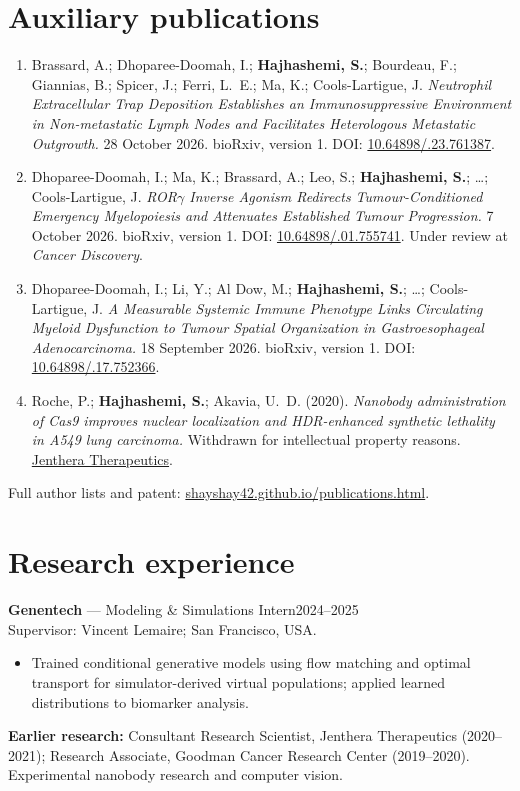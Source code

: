 \documentclass[11pt,letterpaper]{article}
\newcommand{\me}{\textbf{Hajhashemi, S.}}
\begin{document}
\section*{Auxiliary publications}
\begin{enumerate}[start=7,leftmargin=1.2em,itemsep=7pt,topsep=2pt,parsep=0pt]
\item Brassard, A.; Dhoparee-Doomah, I.; \me; Bourdeau, F.; Giannias, B.; Spicer, J.; Ferri, L.~E.; Ma, K.; Cools-Lartigue, J.
\textit{Neutrophil Extracellular Trap Deposition Establishes an Immunosuppressive Environment in Non-metastatic Lymph Nodes and Facilitates Heterologous Metastatic Outgrowth.}
28 October 2026. bioRxiv, version 1. DOI: \href{https://doi.org/10.64898/2026.10.23.761387}{10.64898/.23.761387}.

\item Dhoparee-Doomah, I.; Ma, K.; Brassard, A.; Leo, S.; \me; \ldots; Cools-Lartigue, J.
\textit{ROR$\gamma$ Inverse Agonism Redirects Tumour-Conditioned Emergency Myelopoiesis and Attenuates Established Tumour Progression.}
7 October 2026. bioRxiv, version 1. DOI: \href{https://doi.org/10.64898/2026.10.01.755741}{10.64898/.01.755741}.
Under review at \textit{Cancer Discovery}.
\item Dhoparee-Doomah, I.; Li, Y.; Al Dow, M.; \me; \ldots; Cools-Lartigue, J.
\textit{A Measurable Systemic Immune Phenotype Links Circulating Myeloid Dysfunction to Tumour Spatial Organization in Gastroesophageal Adenocarcinoma.}
18 September 2026. bioRxiv, version 1. DOI: \href{https://doi.org/10.64898/2026.09.17.752366}{10.64898/.17.752366}.
\item Roche, P.; \me; Akavia, U.~D. (2020).
\textit{Nanobody administration of Cas9 improves nuclear localization and HDR-enhanced synthetic lethality in A549 lung carcinoma.}
Withdrawn for intellectual property reasons. \href{https://www.jenthera.com/}{Jenthera Therapeutics}.
\end{enumerate}
Full author lists and patent: \href{https://shayshay42.github.io/publications.html}{shayshay42.github.io/publications.html}.

\newpage
\section*{Research experience}
\textbf{Genentech} — Modeling \& Simulations Intern\hfill 2024--2025\\
Supervisor: Vincent Lemaire; San Francisco, USA.
\begin{itemize}
\item Trained conditional generative models using flow matching and optimal transport for simulator-derived virtual populations; applied learned distributions to biomarker analysis.
\end{itemize}
\textbf{Earlier research:} Consultant Research Scientist, Jenthera Therapeutics (2020--2021); Research Associate, Goodman Cancer Research Center (2019--2020). Experimental nanobody research and computer vision.
\end{document}
